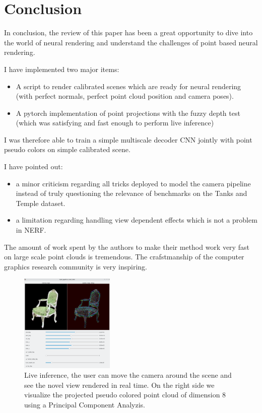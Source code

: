 \section{Conclusion}
\label{sec:conclusion}

In conclusion, the review of this paper has been a great opportunity to dive into the world of neural rendering and understand the challenges of point based neural rendering.

\noindent I have implemented two major items: 
\begin{itemize}
    \item A script to render calibrated scenes which are ready for neural rendering (with perfect normals, perfect point cloud position and camera poses). 
    \item A pytorch implementation of point projections with the fuzzy depth test (which was satisfying and fast enough to perform live inference)
\end{itemize}
I was therefore able to train a simple multiscale decoder CNN jointly with point pseudo colors on simple calibrated scene.

\noindent I have pointed out:
\begin{itemize}
    \item a minor criticism regarding all tricks deployed to model the camera pipeline instead of truly questioning the relevance of benchmarks on the Tanks and Temple dataset. 
    \item a limitation regarding handling view dependent effects which is not a problem in NERF.
\end{itemize}

\noindent The amount of work spent by the authors to make their method work very fast on large scale point clouds is tremendous. The crafstmanship of the computer graphics research community is very inspiring.



\begin{figure}[H]
    \centering
    \includegraphics[width=0.4\textwidth]{figures/inference_live.png}
    \caption{Live inference, the user can move the camera around the scene and see the novel view rendered in real time. On the right side we visualize the projected pseudo colored point cloud of dimension 8 using a Principal Component Analyzis.}
    \label{fig:live_inference}
\end{figure}